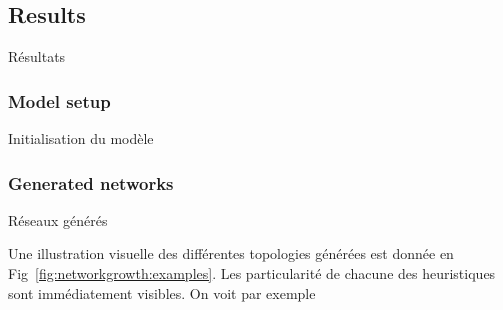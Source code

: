 





\subsection{Results}{Résultats}


\subsubsection{Model setup}{Initialisation du modèle}



\subsubsection{Generated networks}{Réseaux générés}

Une illustration visuelle des différentes topologies générées est donnée en Fig~\ref{fig:networkgrowth:examples}. Les particularité de chacune des heuristiques sont immédiatement visibles. On voit par exemple




